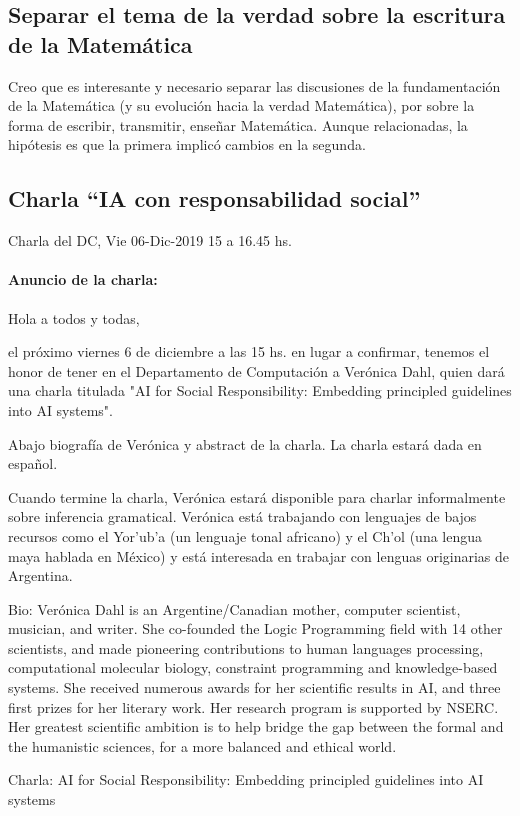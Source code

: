 \documentclass[a4paper,11pt]{article}
\begin{document}
\subsection{Separar el tema de la verdad sobre la escritura de la Matemática}
Creo que es interesante y necesario separar las discusiones de la fundamentación de la Matemática (y su evolución hacia la verdad Matemática), por sobre la forma de escribir, transmitir, enseñar Matemática. Aunque relacionadas, la hipótesis es que la primera implicó cambios en la segunda.


\subsection{Charla ``IA con responsabilidad social''}
Charla del DC, Vie 06-Dic-2019 15 a 16.45 hs.

\paragraph{Anuncio de la charla: } Hola a todos y todas,

el próximo viernes 6 de diciembre a las 15 hs. en lugar a confirmar, tenemos el honor de tener en el Departamento de Computación a Verónica Dahl, quien dará una charla titulada "AI for Social Responsibility: Embedding principled guidelines into AI systems".

Abajo biografía de Verónica y abstract de la charla. La charla estará dada en español.

Cuando termine la charla, Verónica estará disponible para charlar informalmente sobre inferencia gramatical. Verónica está trabajando con lenguajes de bajos recursos como el Yor'ub'a (un lenguaje tonal africano) y el Ch’ol (una lengua maya hablada en México) y está interesada en trabajar con lenguas originarias de Argentina.


Bio: Verónica Dahl is an Argentine/Canadian mother, computer scientist, musician, and writer. She co-founded the Logic Programming field with 14 other scientists, and made pioneering contributions to human languages processing, computational molecular biology, constraint programming and knowledge-based systems. She received numerous awards for her scientific results in AI, and three first prizes for her literary work. Her research program is supported by NSERC. Her greatest scientific ambition is to help bridge the gap between the formal and the humanistic sciences, for a more balanced and ethical world.

Charla: AI for Social Responsibility: Embedding principled guidelines into AI systems
\end{document}
